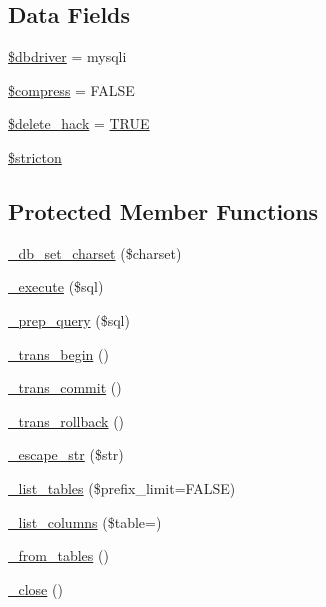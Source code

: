 \subsection*{Data Fields}
\begin{DoxyCompactItemize}
\item 
\mbox{\hyperlink{class_c_i___d_b__mysqli__driver_a0cde2a16322a023d040aa7f725877597}{\$dbdriver}} = \textquotesingle{}mysqli\textquotesingle{}
\item 
\mbox{\hyperlink{class_c_i___d_b__mysqli__driver_abf799de0d30288b91ee73769281dd69d}{\$compress}} = F\+A\+L\+SE
\item 
\mbox{\hyperlink{class_c_i___d_b__mysqli__driver_ad60008f32a478e978c7c3284f320f273}{\$delete\+\_\+hack}} = \mbox{\hyperlink{constants_8php_ae04a3efe6aa42044f803ee90c2277846}{T\+R\+UE}}
\item 
\mbox{\hyperlink{class_c_i___d_b__mysqli__driver_afb42d9811bec1da94506e5764e1439e0}{\$stricton}}
\end{DoxyCompactItemize}
\subsection*{Protected Member Functions}
\begin{DoxyCompactItemize}
\item 
\mbox{\hyperlink{class_c_i___d_b__mysqli__driver_a2b808d420d8e9fea0b73ad7127f5efb8}{\+\_\+db\+\_\+set\+\_\+charset}} (\$charset)
\item 
\mbox{\hyperlink{class_c_i___d_b__mysqli__driver_a114ab675d89bf8324a41785fb475e86d}{\+\_\+execute}} (\$sql)
\item 
\mbox{\hyperlink{class_c_i___d_b__mysqli__driver_a86af88ef0fa6d44ab4691e3f53270339}{\+\_\+prep\+\_\+query}} (\$sql)
\item 
\mbox{\hyperlink{class_c_i___d_b__mysqli__driver_ac81ac882c1d54347d810199a15856aac}{\+\_\+trans\+\_\+begin}} ()
\item 
\mbox{\hyperlink{class_c_i___d_b__mysqli__driver_a6fe7f373e0b11cfae23a5f41c0b35dda}{\+\_\+trans\+\_\+commit}} ()
\item 
\mbox{\hyperlink{class_c_i___d_b__mysqli__driver_ad49a116b0776c26b53114c9093fd102a}{\+\_\+trans\+\_\+rollback}} ()
\item 
\mbox{\hyperlink{class_c_i___d_b__mysqli__driver_af8ef0237bfcdb19215b63fff769e7a55}{\+\_\+escape\+\_\+str}} (\$str)
\item 
\mbox{\hyperlink{class_c_i___d_b__mysqli__driver_a435c0f3ce54fe7daa178baa8532ebd54}{\+\_\+list\+\_\+tables}} (\$prefix\+\_\+limit=F\+A\+L\+SE)
\item 
\mbox{\hyperlink{class_c_i___d_b__mysqli__driver_a7ccb7f9c301fe7f0a9db701254142b63}{\+\_\+list\+\_\+columns}} (\$table=\textquotesingle{}\textquotesingle{})
\item 
\mbox{\hyperlink{class_c_i___d_b__mysqli__driver_aef43f7e3e7b71d337ff3724c5eb14f10}{\+\_\+from\+\_\+tables}} ()
\item 
\mbox{\hyperlink{class_c_i___d_b__mysqli__driver_a4d9082658000e5ede8312067c6dda9db}{\+\_\+close}} ()
\end{DoxyCompactItemize}
